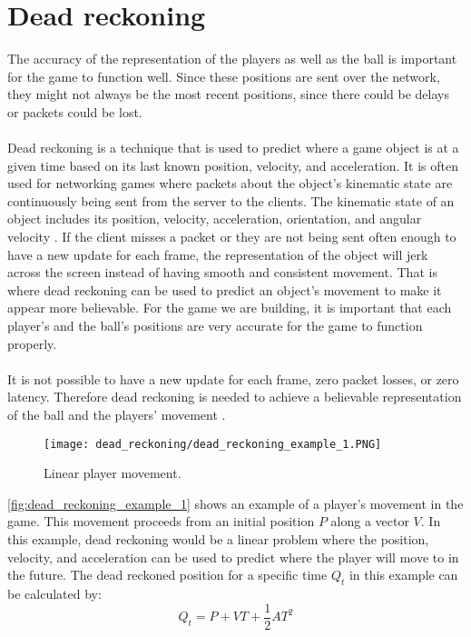 \section{Dead reckoning}\label{sec:dead-reckoning}
The accuracy of the representation of the players as well as the ball is important for the game to function well.
Since these positions are sent over the network, they might not always be the most recent positions, since there could be delays or packets could be lost.
\\\\
Dead reckoning is a technique that is used to predict where a game object is at a given time based on its last known position, velocity, and acceleration.
It is often used for networking games where packets about the object's kinematic state are continuously being sent from the server to the clients.
The kinematic state of an object includes its position, velocity, acceleration, orientation, and angular velocity \cite{deadreckoning}.
If the client misses a packet or they are not being sent often enough to have a new update for each frame, the representation of the object will jerk across the screen instead of having smooth and consistent movement.
That is where dead reckoning can be used to predict an object's movement to make it appear more believable.
For the game we are building, it is important that each player's and the ball's positions are very accurate for the game to function properly.
\\\\
It is not possible to have a new update for each frame, zero packet losses, or zero latency.
Therefore dead reckoning is needed to achieve a believable representation of the ball and the players' movement \cite{deadreckoning}.
\begin{figure}[H]
    \centering
    \texttt{[image: dead\_reckoning/dead\_reckoning\_example\_1.PNG]}
    \caption{Linear player movement.}
    \label{fig:dead_reckoning_example_1}
\end{figure}
\noindent
\autoref{fig:dead_reckoning_example_1} shows an example of a player's movement in the game.
This movement proceeds from an initial position $P$ along a vector $V$.
In this example, dead reckoning would be a linear problem where the position, velocity, and acceleration can be used to predict where the player will move to in the future.
The dead reckoned position for a specific time $Q_t$ in this example can be calculated by:
\begin{displaymath}
    Q_t = P + VT + \frac{1}{2}AT^2
\end{displaymath}
